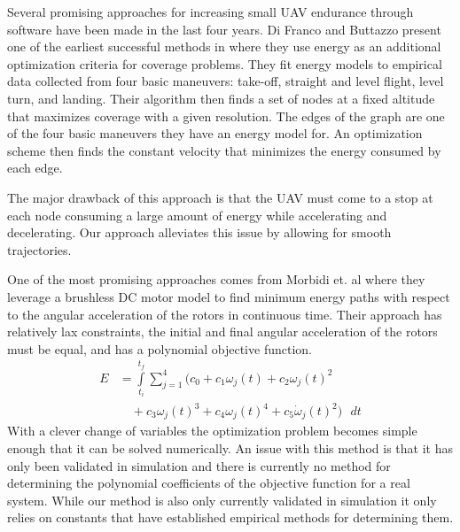 
Several promising approaches for increasing small UAV endurance through software have been made in the last four years. Di Franco and Buttazzo present one of the earliest successful methods in \cite{di2015energy} where they use energy as an additional optimization criteria for coverage problems. They fit energy models to empirical data collected from four basic maneuvers: take-off, straight and level flight, level turn, and landing. Their algorithm then finds a set of nodes at a fixed altitude that maximizes coverage with a given resolution. The edges of the graph are one of the four basic maneuvers they have an energy model for. An optimization scheme then finds the constant velocity that minimizes the energy consumed by each edge.

The major drawback of this approach is that the UAV must come to a stop at each node consuming a large amount of energy while accelerating and decelerating. Our approach alleviates this issue by allowing for smooth trajectories.

One of the most promising approaches comes from Morbidi et. al \cite{morbidi2016minimum} where they leverage a brushless DC motor model to find minimum energy paths with respect to the angular acceleration of the rotors in continuous time. Their approach has relatively lax constraints, the initial and final angular acceleration of the rotors must be equal, and has a polynomial objective function. 
\begin{align*}
    E &= \int\limits_{t_i}^{t_f} \sum\limits_{j=1}^{4} (c_0 + c_1 \omega_j(t) + c_2 \omega_j(t)^2 \\
    &\quad + c_3 \omega_j(t)^3 + c_4 \omega_j(t)^4 + c_5 \dot{\omega}_j(t)^2) \text{ }dt
\end{align*}
With a clever change of variables the optimization problem becomes simple enough that it can be solved numerically. An issue with this method is that it has only been validated in simulation and there is currently no method for determining the polynomial coefficients of the objective function for a real system. While our method is also only currently validated in simulation it only relies on constants that have established empirical methods for determining them.

